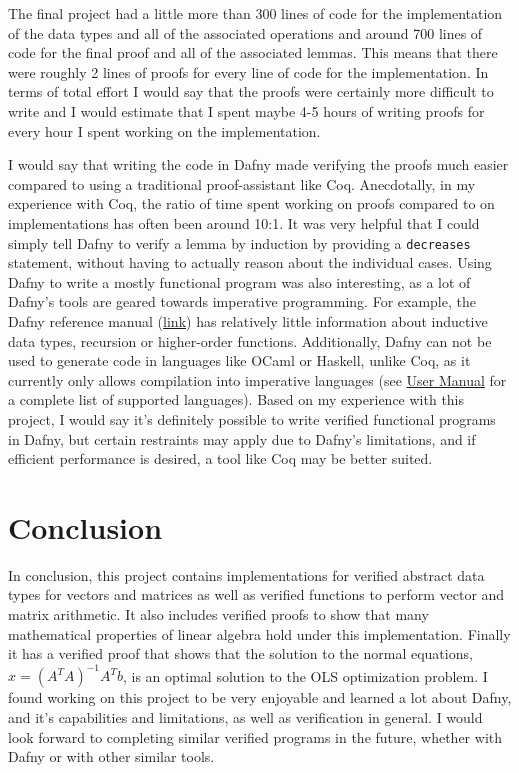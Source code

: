 \documentclass[12pt]{article}
\begin{document}
The final project had a little more than 300 lines of code for the implementation of the data types and all of the associated operations and around 700 lines of code for the final proof and all of the associated lemmas. This means that there were roughly 2 lines of proofs for every line of code for the implementation. In terms of total effort I would say that the proofs were certainly more difficult to write and I would estimate that I spent maybe 4-5 hours of writing proofs for every hour I spent working on the implementation.

I would say that writing the code in Dafny made verifying the proofs much easier compared to using a traditional proof-assistant like Coq. Anecdotally, in my experience with Coq, the ratio of time spent working on proofs compared to on implementations has often been around 10:1. It was very helpful that I could simply tell Dafny to verify a lemma by induction by providing a \verb|decreases| statement, without having to actually reason about the individual cases. Using Dafny to write a mostly functional program was also interesting, as a lot of Dafny's tools are geared towards imperative programming. For example, the Dafny reference manual (\href{https://dafny.org/dafny/DafnyRef/DafnyRef}{link}) has relatively little information about inductive data types, recursion or higher-order functions. Additionally, Dafny can not be used to generate code in languages like OCaml or Haskell, unlike Coq, as it currently only allows compilation into imperative languages (see \href{https://dafny.org/latest/DafnyRef/DafnyRef#sec-dafny-translate}{User Manual} for a complete list of supported languages). Based on my experience with this project, I would say it's definitely possible to write verified functional programs in Dafny, but certain restraints may apply due to Dafny's limitations, and if efficient performance is desired, a tool like Coq may be better suited.

\section{Conclusion}
In conclusion, this project contains implementations for verified abstract data types for vectors and matrices as well as verified functions to perform vector and matrix arithmetic. It also includes verified proofs to show that many mathematical properties of linear algebra hold under this implementation. Finally it has a verified proof that shows that the solution to the normal equations, $x = (A^T A)^{-1} A^T b$, is an optimal solution to the OLS optimization problem. I found working on this project to be very enjoyable and learned a lot about Dafny, and it's capabilities and limitations, as well as verification in general. I would look forward to completing similar verified programs in the future, whether with Dafny or with other similar tools.
\end{document}
